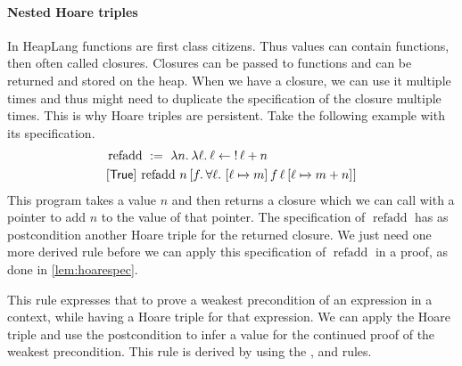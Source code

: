 \documentclass[thesis.tex]{subfiles}
\begin{document}
\paragraph*{Nested Hoare triples}
In HeapLang functions are first class citizens. Thus values can contain functions, then often called closures. Closures can be passed to functions and can be returned and stored on the heap. When we have a closure, we can use it multiple times and thus might need to duplicate the specification of the closure multiple times. This is why Hoare triples are persistent. Take the following example with its specification.
\begin{align*}
     & \operatorname{refadd}\ :=\ \Lam n. \Lam \loc. \loc \gets \deref \loc + n                                                 \\
     & \hoare{\TRUE}{\operatorname{refadd}\, n}{\Ret f. {\forall \loc.\ \hoare{\loc \fmapsto m}{f\, \loc}{\loc\fmapsto m + n}}}
\end{align*}
This program takes a value $n$ and then returns a closure which we can call with a pointer to add $n$ to the value of that pointer. The specification of $\operatorname{refadd}$ has as postcondition another Hoare triple for the returned closure. We just need one more derived rule before we can apply this specification of $\operatorname{refadd}$ in a proof, as done in \cref{lem:hoarespec}.
This rule expresses that to prove a weakest precondition of an expression in a context, while having a Hoare triple for that expression. We can apply the Hoare triple and use the postcondition to infer a value for the continued proof of the weakest precondition. This rule is derived by using the ,  and  rules.
\end{document}
